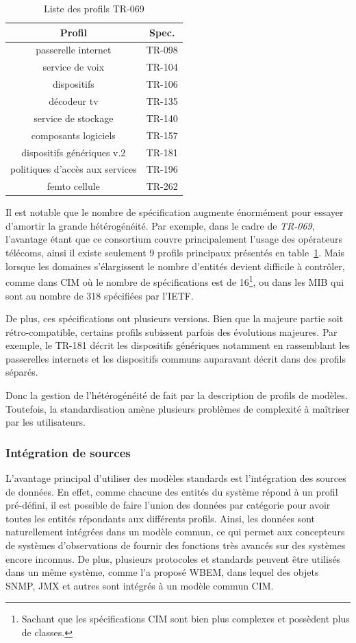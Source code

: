 \begin{table}
\centering
{\scriptsize
\begin{tabular}{cc}
\toprule
Profil & Spec. \\ \toprule
passerelle internet & TR-098 \\ \midrule
service de voix & TR-104 \\ \midrule
dispositifs & TR-106 \\ \midrule
décodeur tv & TR-135 \\ \midrule
service de stockage & TR-140 \\ \midrule
composants logiciels & TR-157 \\ \midrule
dispositifs génériques v.2 & TR-181 \\  \midrule
politiques d'accès aux services &  TR-196 \\ \midrule
femto cellule & TR-262 \\ \bottomrule
\end{tabular}
}
\caption{Liste  des profils TR-069}\label{tab:rw:supervision:tr069dm}
\end{table}
Il est notable que le nombre de spécification augmente énormément pour essayer d'amortir la grande hétérogénéité. Par exemple, dans le cadre de \textit{TR-069}, l'avantage étant que ce consortium couvre principalement l'usage des opérateurs télécoms, ainsi il existe seulement 9 profils principaux présentés en table~\ref{tab:rw:supervision:tr069dm}. Mais lorsque les domaines s'élargissent le nombre d'entités devient difficile à contrôler, comme dans CIM où le nombre de spécifications est de 16\footnote{Sachant que les spécifications CIM sont bien plus complexes et possèdent plus de classes.}, ou dans les MIB qui sont au nombre de 318 spécifiées par l'IETF.

De plus, ces spécifications ont plusieurs versions. Bien que la majeure partie soit rétro-compatible, certains profils subissent parfois des évolutions majeures. Par exemple, le TR-181 décrit les dispositifs génériques notamment en rassemblant les passerelles internets et les dispositifs communs auparavant décrit dans des profils séparés. 

Donc la gestion de l'hétérogénéité de fait par la description de profils de modèles. Toutefois, la standardisation amène plusieurs problèmes de complexité à maîtriser par les utilisateurs.

\subsubsection{Intégration de sources}
L'avantage principal d'utiliser des modèles standards est l'intégration des sources de données. En effet, comme chacune des entités du système répond à un profil pré-défini, il est possible de faire l'union des données par catégorie pour avoir toutes les entités répondants aux différents profils. Ainsi, les données sont naturellement intégrées dans un modèle commun, ce qui permet aux concepteurs de systèmes d'observations de fournir des fonctions très avancés sur des systèmes encore inconnus. De plus, plusieurs protocoles et standards peuvent être utilisés dans un même système, comme l'a proposé WBEM, dans lequel des objets SNMP, JMX et autres sont intégrés à un modèle commun CIM.

